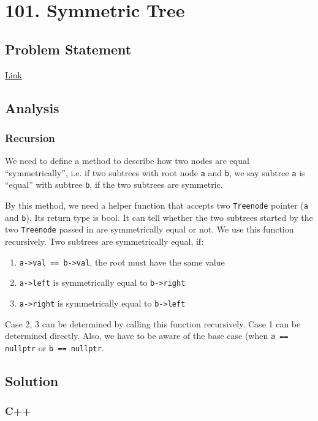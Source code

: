 \documentclass[11pt]{article}
\begin{document}
\section{101. Symmetric Tree}
\label{sec:org09c74bd}
\subsection{Problem Statement}
\label{sec:orge5b5e86}
\href{https://leetcode.com/problems/symmetric-tree/}{Link}
\subsection{Analysis}
\label{sec:orgab50506}
\subsubsection{Recursion}
\label{sec:orgb62b8d8}
We need to define a method to describe how two nodes are equal ``symmetrically'', i.e. if two subtrees with root node \texttt{a} and \texttt{b}, we say subtree \texttt{a} is ``equal'' with subtree \texttt{b}, if the two subtrees are symmetric.

By this method, we need a helper function that accepts two \texttt{Treenode} pointer (\texttt{a} and \texttt{b}). Its return type is bool. It can tell whether the two subtrees started by the two \texttt{Treenode} passed in are symmetrically equal or not. We use this function recursively. Two subtrees are symmetrically equal, if:
\begin{enumerate}
\item \texttt{a->val == b->val}, the root must have the same value
\item \texttt{a->left} is symmetrically equal to \texttt{b->right}
\item \texttt{a->right} is symmetrically equal to \texttt{b->left}
\end{enumerate}
Case 2, 3 can be determined by calling this function recursively. Case 1 can be determined directly. Also, we have to be aware of the base case (when \texttt{a == nullptr} or \texttt{b == nullptr}.

\subsection{Solution}
\label{sec:org16f6843}
\subsubsection{C++}
\label{sec:orgdae9a70}
\end{document}
